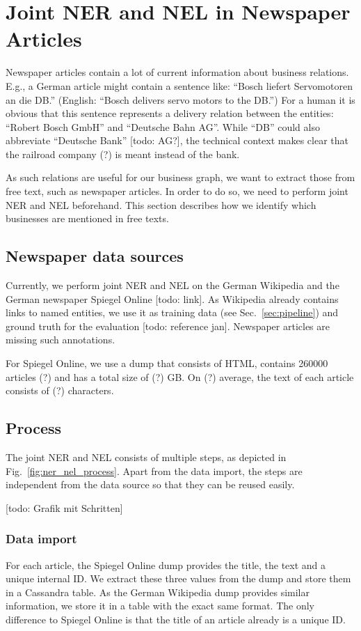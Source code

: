 \section{Joint NER and NEL in Newspaper Articles}
\label{sec:nel}

Newspaper articles contain a lot of current information about business relations. E.g., a German article might contain a sentence like: "`Bosch liefert Servomotoren an die DB."' (English: "`Bosch delivers servo motors to the DB."') For a human it is obvious that this sentence represents a delivery relation between the entities: "`Robert Bosch GmbH"' and "`Deutsche Bahn AG"'. While "`DB"' could also abbreviate "`Deutsche Bank"' [todo: AG?], the technical context makes clear that the railroad company (?) is meant instead of the bank.

As such relations are useful for our business graph, we want to extract those from free text, such as newspaper articles. In order to do so, we need to perform joint NER and NEL beforehand. This section describes how we identify which businesses are mentioned in free texts.\\

\subsection{Newspaper data sources}
Currently, we perform joint NER and NEL on the German Wikipedia and the German newspaper Spiegel Online [todo: link]. As Wikipedia already contains links to named entities, we use it as training data (see Sec.~\ref{sec:pipeline}) and ground truth for the evaluation [todo: reference jan]. Newspaper articles are missing such annotations.

For Spiegel Online, we use a dump that consists of HTML, contains 260000 articles (?) and has a total size of (?) GB. On (?) average, the text of each article consists of (?) characters.\\

\subsection{Process}
The joint NER and NEL consists of multiple steps, as depicted in Fig.~\ref{fig:ner_nel_process}. Apart from the data import, the steps are independent from the data source so that they can be reused easily.

[todo: Grafik mit Schritten]

\subsubsection{Data import}
For each article, the Spiegel Online dump provides the title, the text and a unique internal ID. We extract these three values from the dump and store them in a Cassandra table. As the German Wikipedia dump provides similar information, we store it in a table with the exact same format. The only difference to Spiegel Online is that the title of an article already is a unique ID.\\

